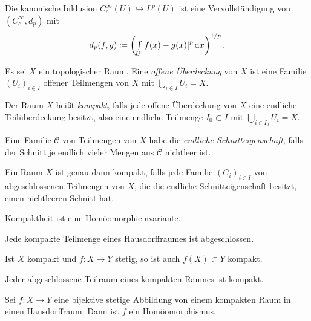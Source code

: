 \documentclass{cheat-sheet}
\begin{document}
\begin{bsp}
  Die kanonische Inklusion $C_c^{\infty}(U) \hookrightarrow L^p(U)$ ist eine Vervollständigung von $(C_c^{\infty}, d_p)$ mit
  \[ d_p(f, g) \coloneqq \left( {\textstyle \int\limits_{U}^{}} \lvert f(x) - g(x)\rvert^p \,\mathrm{d} x \right)^{1/p}. \]
\end{bsp}

\begin{defn}
  Es sei $X$ ein topologischer Raum. Eine \emph{offene Überdeckung} von $X$ ist eine Familie $(U_i)_{i \in I}$ offener Teilmengen von $X$ mit $\bigcup_{i \in I} U_i = X$.
\end{defn}

\begin{defn}
  Der Raum $X$ heißt \emph{kompakt}, falls jede offene Überdeckung von $X$ eine endliche Teilüberdeckung besitzt, also eine endliche Teilmenge $I_0 \subset I$ mit $\bigcup_{i \in I_0} U_i = X$.
\end{defn}

\begin{defn}
  Eine Familie $\mathcal{C}$ von Teilmengen von $X$ habe die \emph{endliche Schnitteigenschaft}, falls der Schnitt je endlich vieler Mengen aus $\mathcal{C}$ nichtleer ist.
\end{defn}

\begin{prop}
  Ein Raum $X$ ist genau dann kompakt, falls jede Familie $(C_i)_{i \in I}$ von abgeschlossenen Teilmengen von $X$, die die endliche Schnitteigenschaft besitzt, einen nichtleeren Schnitt hat. %
\end{prop}

\begin{bem}
  Kompaktheit ist eine Homöomorphieinvariante.
\end{bem}

\begin{prop}
  Jede kompakte Teilmenge eines Hausdorffraumes ist abgeschlossen.
\end{prop}

\begin{prop}
  Ist $X$ kompakt und $f : X \to Y$ stetig, so ist auch $f(X) \subset Y$ kompakt.
\end{prop}

\begin{prop}
  Jeder abgeschlossene Teilraum eines kompakten Raumes ist kompakt.
\end{prop}

\begin{prop}
  Sei $f : X \to Y$ eine bijektive stetige Abbildung von einem kompakten Raum in einen Hausdorffraum. Dann ist $f$ ein Homöomorphismus.
\end{prop}
\end{document}
